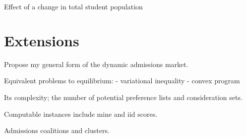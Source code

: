 \documentclass[12pt]{article}
\theoremstyle{definition}
\begin{document}
Effect of a change in total student population


\section{Extensions}
Propose my general form of the dynamic admissions market.

Equivalent problems to equilibrium:
- variational inequality
- convex program

Its complexity; the number of potential preference lists and consideration sets.

Computable instances include mine and iid scores.

Admissions coalitions and clusters. 
\pagebreak
\printbibliography
\end{document}
